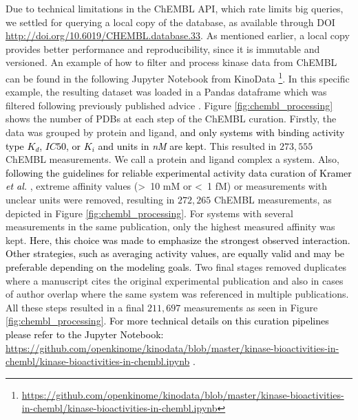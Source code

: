 \documentclass[9pt,lessons, pubversion]{livecoms}
\newcommand{\revision}[1]{\textcolor{black}{#1}}
\begin{document}
Due to technical limitations in the ChEMBL API, which rate limits big queries, we settled for querying a local copy of the database, as available through DOI \url{http://doi.org/10.6019/CHEMBL.database.33}. 
As mentioned earlier, a local copy provides better performance and reproducibility, since it is immutable and versioned. 
An example of how to filter and process kinase data from ChEMBL can be found in the following Jupyter Notebook from KinoData \footnote{\url{https://github.com/openkinome/kinodata/blob/master/kinase-bioactivities-in-chembl/kinase-bioactivities-in-chembl.ipynb}}.  In this specific example, the resulting dataset was loaded in a Pandas dataframe which was filtered following previously published advice \cite{Kalliokoski2013, Kramer2012}. 
Figure \ref{fig:chembl_processing} shows the number of PDBs at each step of the ChEMBL curation. Firstly, the data was grouped by protein and ligand, \revision{and only systems with binding activity type $K_d$, $IC50$, or $K_i$ and units in \textit{nM} are kept.} %
This resulted in $273,555$ ChEMBL measurements. We call a protein and ligand complex a system. %
Also, \revision{following the guidelines for reliable experimental activity data curation of Kramer \textit{et al.} \cite{Kramer2012}}, extreme affinity values (\textgreater\ 10 mM or \textless\ 1 fM) or measurements with unclear units were removed, resulting in $272,265$ ChEMBL measurements, as depicted in Figure \ref{fig:chembl_processing}. For systems with several measurements in the same publication, only the highest measured affinity was kept. \revision{Here, this choice was made to emphasize the strongest observed interaction. Other strategies, such as averaging activity values, are equally valid and may be preferable depending on the modeling goals. \cite{hernandez2023experimental}} Two final stages removed duplicates where a manuscript cites the original experimental publication and also in cases of author overlap where the same system was referenced in multiple publications. All these steps resulted in a final $211,697$ measurements as seen in Figure \ref{fig:chembl_processing}. \revision{For more technical details on this curation pipelines please refer to the Jupyter Notebook: \url{https://github.com/openkinome/kinodata/blob/master/kinase-bioactivities-in-chembl/kinase-bioactivities-in-chembl.ipynb} .} 
\end{document}
